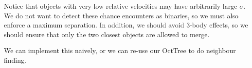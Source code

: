 \documentclass[12pt]{article}
\begin{document}
Notice that objects with very low relative velocities may have arbitrarily large $\sigma$. We do not want to detect these chance encounters as binaries, so we must also enforce a maximum separation. In addition, we should avoid 3-body effects, so we should ensure that only the two closest objects are allowed to merge.

We can implement this naively, or we can re-use our OctTree to do neighbour finding.
\end{document}
